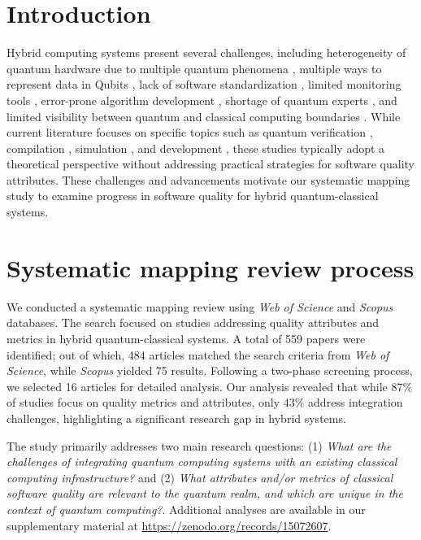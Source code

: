 \section{Introduction}

Hybrid computing systems present several challenges, including heterogeneity of quantum hardware due to multiple quantum phenomena \cite{Elsharkawy2023, Sodhi2021}, multiple ways to represent data in Qubits \cite{Moguel2022}, lack of software standardization \cite{Elsharkawy2023, Cerezo2022, Sodhi2021}, limited monitoring tools \cite{Moguel2022, 40}, error-prone algorithm development \cite{Sodhi2021}, shortage of quantum experts \cite{Sodhi2021}, and limited visibility between quantum and classical computing boundaries \cite{Vietz2021}. While current literature focuses on specific topics such as quantum verification \cite{22}, compilation \cite{Campbell2018}, simulation \cite{25}, and development \cite{26}, these studies typically adopt a theoretical perspective without addressing practical strategies for software quality attributes. These challenges and advancements motivate our systematic mapping study to examine progress in software quality for hybrid quantum-classical systems.

\section{Systematic mapping review process}

We conducted a systematic mapping review using \textit{Web of Science} and \textit{Scopus} databases. The search focused on studies addressing quality attributes and metrics in hybrid quantum-classical systems. A total of 559 papers were identified; out of which, 484 articles matched the search criteria from \textit{Web of Science}, while \textit{Scopus} yielded 75 results. Following a two-phase screening process, we selected 16 articles for detailed analysis. Our analysis revealed that while 87\% of studies focus on quality metrics and attributes, only 43\% address integration challenges, highlighting a significant research gap in hybrid systems.

The study primarily addresses two main research questions: (1) \textit{What are the challenges of integrating quantum computing systems with an existing classical computing infrastructure?} and (2) \textit{What attributes and/or metrics of classical software quality are relevant to the quantum realm, and which are unique in the context of quantum computing?}. Additional analyses are available in our supplementary material at \url{https://zenodo.org/records/15072607}.

